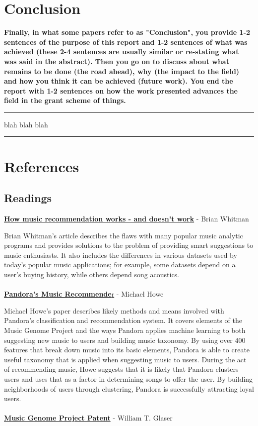 \documentclass[12pt]{article}
\newcommand{\horizontalLine}{
	\begin{center}
		\hrule width 1.0\textwidth
	\end{center}
}
\newcommand{\smallHorizontalLine}{
    \begin{center}
        \hrule width 0.5\textwidth
    \end{center}}
\begin{document}
\section{Conclusion}
\label{sec:conclusion}
\textbf{Finally, in what some papers refer to as "Conclusion", you provide 1-2 sentences of the purpose
of this report and 1-2 sentences of what was achieved (these 2-4 sentences are usually similar
or re-stating what was said in the abstract). Then you go on to discuss about what remains to
be done (the road ahead), why (the impact to the field) and how you think it can be achieved
(future work). You end the report with 1-2 sentences on how the work presented advances the
field in the grant scheme of things.}
\smallHorizontalLine

blah blah blah

\horizontalLine
\section{References}
\label{sec:references}

\subsection{Readings}
\href{http://notes.variogr.am/post/37675885491/how-music-recommendation-works-and-doesnt-work}{\textbf{How music recommendation works - and doesn't work}} - Brian Whitman

Brian Whitman's article describes the flaws with many popular music analytic programs and provides solutions to the problem of providing smart suggestions to music enthusiasts. It also includes the differences in various datasets used by today's popular music applications; for example, some datasets depend on a user's buying history, while others depend song acoustics.
\\
\\
\href{http://courses.cs.washington.edu/courses/csep521/07wi/prj/michael.pdf}{\textbf{Pandora's Music Recommende}r} - Michael Howe 

Michael Howe's paper describes likely methods and means involved with Pandora's classification and recommendation system. It covers elements of the Music Genome Project and the ways Pandora applies machine learning to both suggesting new music to users and building music taxonomy. By using over 400 features that break down music into its basic elements, Pandora is able to create useful taxonomy that is applied when suggesting music to users. During the act of recommending music, Howe suggests that it is likely that Pandora clusters users and uses that as a factor in determining songs to offer the user. By building neighborhoods of users through clustering, Pandora is successfully attracting loyal users.
\\
\\
\href{http://www.google.com/patents/US7003515?dq=7,003,515}{\textbf{Music Genome Project Patent}} - William T. Glaser 
\end{document}

